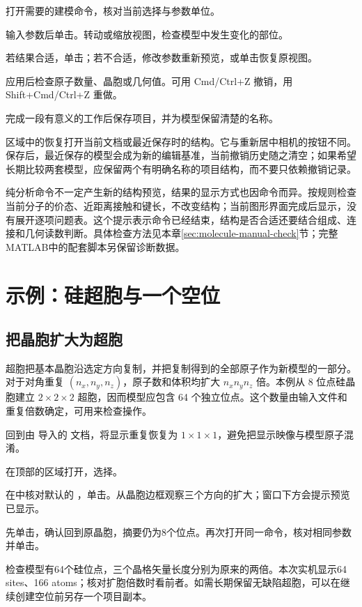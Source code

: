 \begin{steps}
  \item 打开需要的建模命令，核对当前选择与参数单位。
  \item 输入参数后单击。转动或缩放视图，检查模型中发生变化的部位。
  \item 若结果合适，单击；若不合适，修改参数重新预览，或单击恢复原视图。
  \item 应用后检查原子数量、晶胞或几何值。可用 Cmd/Ctrl+Z 撤销，用 Shift+Cmd/Ctrl+Z 重做。
  \item 完成一段有意义的工作后保存项目，并为模型保留清楚的名称。
\end{steps}

区域中的恢复打开当前文档或最近保存时的结构。它与重新居中相机的按钮不同。保存后，最近保存的模型会成为新的编辑基准，当前撤销历史随之清空；如果希望长期比较两套模型，应保留两个有明确名称的项目结构，而不要只依赖撤销记录。

纯分析命令不一定产生新的结构预览，结果的显示方式也因命令而异。按规则检查当前分子的价态、近距离接触和键长，不改变结构；当前图形界面完成后显示，没有展开逐项问题表。这个提示表示命令已经结束，结构是否合适还要结合组成、连接和几何读数判断。具体检查方法见本章\ref{sec:molecule-manual-check}节；完整MATLAB\regmark{}中的配套脚本另保留诊断数据。

\section{示例：硅超胞与一个空位}

\subsection{把晶胞扩大为超胞}

超胞把基本晶胞沿选定方向复制，并把复制得到的全部原子作为新模型的一部分。对于对角重复 $(n_x,n_y,n_z)$，原子数和体积均扩大 $n_xn_yn_z$ 倍。本例从 8 位点硅晶胞建立 $2\times2\times2$ 超胞，因而模型应包含 64 个独立位点。这个数量由输入文件和重复倍数确定，可用来检查操作。

\begin{steps}
  \item 回到由  导入的  文档，将显示重复恢复为 $1\times1\times1$，避免把显示映像与模型原子混淆。
  \item 在顶部的区域打开，选择。
  \item 在中核对默认的 ，单击。从晶胞边框观察三个方向的扩大；窗口下方会提示预览已显示。
  \item 先单击，确认回到原晶胞，摘要仍为8个位点。再次打开同一命令，核对相同参数并单击。
  \item 检查模型有64个硅位点，三个晶格矢量长度分别为原来的两倍。本次实机显示64 sites、166 atoms；核对扩胞倍数时看前者。如需长期保留无缺陷超胞，可以在继续创建空位前另存一个项目副本。
\end{steps}

